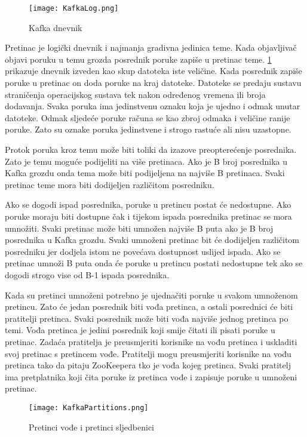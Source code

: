 \documentclass[utf8, diplomski, lmodern, numeric]{fer}
\begin{document}
\begin{figure}[H]
    \centering
    \texttt{[image: KafkaLog.png]}
    \caption{Kafka dnevnik}
    \label{fig:kafka-log}
\end{figure}

Pretinac je logički dnevnik i najmanja gradivna jedinica teme. Kada objavljivač objavi poruku u temu grozda posrednik poruke zapiše u pretinac teme. \ref{fig:kafka-log} prikazuje dnevnik izveden kao skup datoteka iste veličine. Kada posrednik zapiše poruke u pretinac on doda poruke na kraj datoteke. Datoteke se predaju sustavu straničenja operacijskog sustava tek nakon određenog vremena ili broja dodavanja. Svaka poruka ima jedinstvenu oznaku koja je ujedno i odmak unutar datoteke. Odmak sljedeće poruke računa se kao zbroj odmaka i veličine ranije poruke. Zato su oznake poruka jedinstvene i strogo rastuće ali nisu uzastopne.

Protok poruka kroz temu može biti toliki da izazove preopterećenje posrednika. Zato je temu moguće podijeliti na više pretinaca. Ako je B broj posrednika u Kafka grozdu onda tema može biti podijeljena na najviše B pretinaca. Svaki pretinac teme mora biti dodijeljen različitom posredniku.

Ako se dogodi ispad posrednika, poruke u pretincu postat će nedostupne. Ako poruke moraju biti dostupne čak i tijekom ispada posrednika pretinac se mora umnožiti. Svaki pretinac može biti umnožen najviše B puta ako je B broj posrednika u Kafka grozdu. Svaki umnoženi pretinac bit će dodijeljen različitom posredniku jer dodjela istom ne povećava dostupnost uslijed ispada. Ako se pretinac umnoži B puta onda će poruke u pretincu postati nedostupne tek ako se dogodi strogo vise od B-1 ispada posrednika.

Kada su pretinci umnoženi potrebno je ujednačiti poruke u svakom umnoženom pretincu. Zato će jedan posrednik biti vođa pretinca, a ostali posrednici će biti pratitelji pretinca. Svaki posrednik može biti vođa najviše jednog pretinca po temi. Vođa pretinca je jedini posrednik koji smije čitati ili pisati poruke u pretinac. Zadaća pratitelja je preusmjeriti korisnike na vođu pretinca i uskladiti svoj pretinac s pretincem vođe. Pratitelji mogu preusmjeriti korisnike na vođu pretinca tako da pitaju ZooKeepera tko je vođa kojeg pretinca. Svaki pratitelj ima pretplatnika koji čita poruke iz pretinca vođe i zapisuje poruke u umnoženi pretinac.

\begin{figure}[H]
    \centering
    \texttt{[image: KafkaPartitions.png]}
    \caption{Pretinci vođe i pretinci sljedbenici}
    \label{fig:kafka-leader-follower}
\end{figure}
\end{document}
